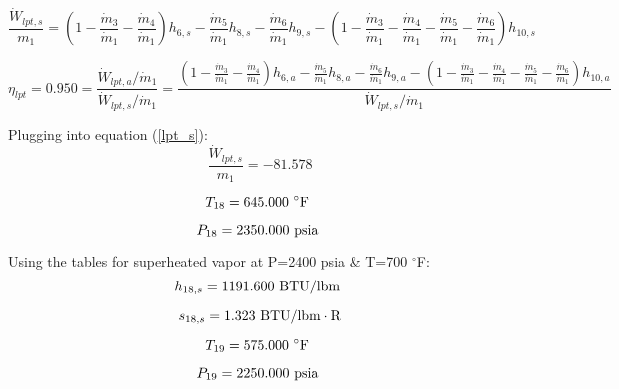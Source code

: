 \documentclass{article}
\begin{document}
\begin{equation}\label{lpt_s}
\frac{\dot{W}_{lpt,s}}{m_1} = (1 - \frac{\dot{m}_{ 3}}{\dot{m}_{ 1}} - \frac{\dot{m}_{ 4}}{\dot{m}_{ 1}})h_{ 6,s} - \frac{\dot{m}_{ 5}}{\dot{m}_{ 1}}h_{ 8,s} - \frac{\dot{m}_{ 6}}{\dot{m}_{ 1}}h_{ 9,s} - (1 - \frac{\dot{m}_{ 3}}{\dot{m}_{ 1}} - \frac{\dot{m}_{ 4}}{\dot{m}_{ 1}} - \frac{\dot{m}_{ 5}}{\dot{m}_{ 1}} - \frac{\dot{m}_{ 6}}{\dot{m}_{ 1}})h_{10,s}\end{equation}

\begin{equation}
\eta_{lpt} =    0.950 = \frac{\dot{W}_{lpt,a} / \dot{m}_{1}}{\dot{W}_{lpt,s} / \dot{m}_{1}} = \frac{
(1 - \frac{\dot{m}_{ 3}}{\dot{m}_{ 1}} - \frac{\dot{m}_{ 4}}{\dot{m}_{ 1}})h_{ 6,a} - \frac{\dot{m}_{ 5}}{\dot{m}_{ 1}}h_{ 8,a} - \frac{\dot{m}_{ 6}}{\dot{m}_{ 1}}h_{ 9,a} - (1 - \frac{\dot{m}_{ 3}}{\dot{m}_{ 1}} - \frac{\dot{m}_{ 4}}{\dot{m}_{ 1}} - \frac{\dot{m}_{ 5}}{\dot{m}_{ 1}} - \frac{\dot{m}_{ 6}}{\dot{m}_{ 1}})h_{10,a}}{\dot{W}_{lpt,s} / \dot{m}_{1}}
\end{equation}


Plugging into equation (\ref{lpt_s}):
\begin{equation}
\frac{\dot{W}_{lpt,s}}{m_1} =  -81.578
\end{equation}

\begin{equation}
T_{18} =  645.000\textnormal{ \(^{\circ}\)F             }
\end{equation}

\begin{equation}
P_{18} = 2350.000\textnormal{ psia                      }
\end{equation}

Using the tables for superheated vapor at P=2400 psia \& T=700 \(^{\circ}\)F:
\begin{equation}
  h_{18,s} = 1191.600\textnormal{ BTU/lbm                   }
\end{equation}

\begin{equation}
  s_{18,s} =    1.323\textnormal{ BTU/lbm}\cdot\textnormal{R}
\end{equation}

\begin{equation}
T_{19} =  575.000\textnormal{ \(^{\circ}\)F             }
\end{equation}

\begin{equation}
P_{19} = 2250.000\textnormal{ psia                      }
\end{equation}
\end{document}
